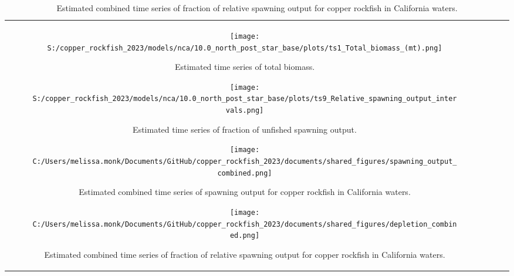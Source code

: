 \documentclass[11pt,
  letterpaper,
]{article}
\begin{document}
\begin{longtable}[t]{c>{\centering\arraybackslash}p{2cm}>{\centering\arraybackslash}p{2cm}>{\centering\arraybackslash}p{2cm}}
\pagebreak

\begin{figure}
{\centering
\texttt{[image: S:/copper\_rockfish\_2023/models/nca/10.0\_north\_post\_star\_base/plots/ts1\_Total\_biomass\_(mt).png]}
}
\caption{Estimated time series of total biomass.\label{fig:tot-bio}}
\end{figure}

\pagebreak

\begin{figure}
{\centering
\texttt{[image: S:/copper\_rockfish\_2023/models/nca/10.0\_north\_post\_star\_base/plots/ts9\_Relative\_spawning\_output\_intervals.png]}
}
\caption{Estimated time series of fraction of unfished spawning output.\label{fig:depl}}
\end{figure}

\pagebreak

\begin{figure}
{\centering
\texttt{[image: C:/Users/melissa.monk/Documents/GitHub/copper\_rockfish\_2023/documents/shared\_figures/spawning\_output\_combined.png]}
}
\caption{Estimated combined time series of spawning output for copper rockfish in California waters.\label{fig:sb-all}}
\end{figure}

\clearpage

\begin{figure}
{\centering
\texttt{[image: C:/Users/melissa.monk/Documents/GitHub/copper\_rockfish\_2023/documents/shared\_figures/depletion\_combined.png]}
}
\caption{Estimated combined time series of fraction of relative spawning output for copper rockfish in California waters.\label{fig:depl-all}}
\end{figure}


\end{longtable}
\end{document}
